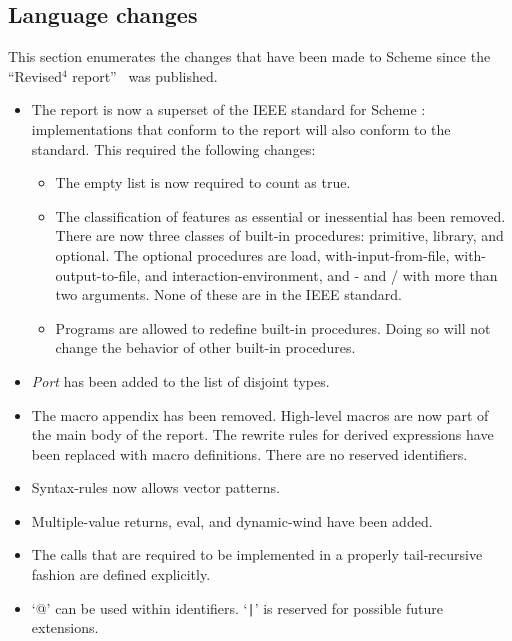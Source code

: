 


\subsection*{Language changes}
\label{differences}

This section enumerates the changes that have been made to Scheme since
the ``Revised$^4$ report''~\cite{R4RS} was published.

\begin{itemize}

\item The report is now a superset of the IEEE standard for Scheme
\cite{IEEEScheme}: implementations that conform to the report will
also conform to the standard.  This required the following changes:
\begin{itemize}

\item The empty list is now required to count as true.

\item The classification of features as essential or inessential has been
removed.  There are now three classes of built-in procedures: primitive,
library, and optional.  The optional procedures are {\cf load},
{\cf with-input-from-file}, {\cf with-output-\linebreak[0]to-file}, and
{\cf interaction-\linebreak[0]environment},
and {\cf -} and {\cf /} with more than two arguments.
None of these are in the IEEE standard.

\item Programs are allowed to redefine built-in procedures.  Doing so
will not change the behavior of other built-in procedures.
\end{itemize}

\item {\em Port} has been added to the list of disjoint types.

\item The macro appendix has been removed.  High-level macros are now part
of the main body of the report.  The rewrite rules for derived expressions
have been replaced with macro definitions.  There are no reserved identifiers.

\item {\cf Syntax-rules} now allows vector patterns.

\item Multiple-value returns, {\cf eval}, and {\cf dynamic-wind} have
been added.

\item The calls that are required to be implemented in a properly tail-recursive
fashion are defined explicitly.

\item `{\cf @}' can be used within identifiers. `{\cf \verb"|"}' is reserved
for possible future extensions.

\end{itemize}

